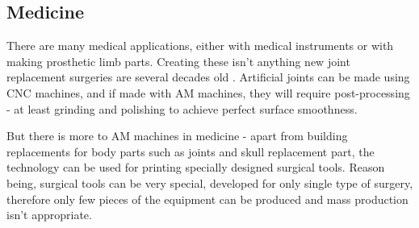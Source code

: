 \documentclass[a4paper, twoside, 11pt]{report}
\begin{document}
\subsection{Medicine}
There are many medical applications, either with medical instruments or with making prosthetic limb parts. Creating these isn't anything new joint replacement surgeries are several decades old \cite{JointReplacement}. Artificial joints can be made using CNC machines, and if made with AM machines, they will require post-processing - at least grinding and polishing to achieve perfect surface smoothness.

	But there is more to AM machines in medicine - apart from building replacements for body parts such as joints and skull replacement part, the technology can be used for printing specially designed surgical tools. Reason being, surgical tools can be very special, developed for only single type of surgery, therefore only few pieces of the equipment can be produced and mass production isn't appropriate.
	
\end{document}
